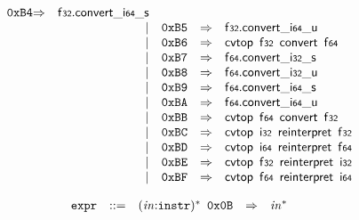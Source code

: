 $$\begin{array}{@{}l@{}rrlll@{}l@{}}
\mathtt{0xB4} &\Rightarrow& \mathsf{f{\scriptstyle32}} . {{{{\mathsf{convert}}{\mathsf{\_}}}{\mathsf{i{\scriptstyle64}}}}{\mathsf{\_}}}{\mathsf{s}} \\ &&|&
\mathtt{0xB5} &\Rightarrow& \mathsf{f{\scriptstyle32}} . {{{{\mathsf{convert}}{\mathsf{\_}}}{\mathsf{i{\scriptstyle64}}}}{\mathsf{\_}}}{\mathsf{u}} \\ &&|&
\mathtt{0xB6} &\Rightarrow& \mathsf{cvtop}~\,\mathsf{f{\scriptstyle32}}~\,\mathsf{convert}~\,\mathsf{f{\scriptstyle64}} \\ &&|&
\mathtt{0xB7} &\Rightarrow& \mathsf{f{\scriptstyle64}} . {{{{\mathsf{convert}}{\mathsf{\_}}}{\mathsf{i{\scriptstyle32}}}}{\mathsf{\_}}}{\mathsf{s}} \\ &&|&
\mathtt{0xB8} &\Rightarrow& \mathsf{f{\scriptstyle64}} . {{{{\mathsf{convert}}{\mathsf{\_}}}{\mathsf{i{\scriptstyle32}}}}{\mathsf{\_}}}{\mathsf{u}} \\ &&|&
\mathtt{0xB9} &\Rightarrow& \mathsf{f{\scriptstyle64}} . {{{{\mathsf{convert}}{\mathsf{\_}}}{\mathsf{i{\scriptstyle64}}}}{\mathsf{\_}}}{\mathsf{s}} \\ &&|&
\mathtt{0xBA} &\Rightarrow& \mathsf{f{\scriptstyle64}} . {{{{\mathsf{convert}}{\mathsf{\_}}}{\mathsf{i{\scriptstyle64}}}}{\mathsf{\_}}}{\mathsf{u}} \\ &&|&
\mathtt{0xBB} &\Rightarrow& \mathsf{cvtop}~\,\mathsf{f{\scriptstyle64}}~\,\mathsf{convert}~\,\mathsf{f{\scriptstyle32}} \\ &&|&
\mathtt{0xBC} &\Rightarrow& \mathsf{cvtop}~\,\mathsf{i{\scriptstyle32}}~\,\mathsf{reinterpret}~\,\mathsf{f{\scriptstyle32}} \\ &&|&
\mathtt{0xBD} &\Rightarrow& \mathsf{cvtop}~\,\mathsf{i{\scriptstyle64}}~\,\mathsf{reinterpret}~\,\mathsf{f{\scriptstyle64}} \\ &&|&
\mathtt{0xBE} &\Rightarrow& \mathsf{cvtop}~\,\mathsf{f{\scriptstyle32}}~\,\mathsf{reinterpret}~\,\mathsf{i{\scriptstyle32}} \\ &&|&
\mathtt{0xBF} &\Rightarrow& \mathsf{cvtop}~\,\mathsf{f{\scriptstyle64}}~\,\mathsf{reinterpret}~\,\mathsf{i{\scriptstyle64}} \\
\end{array}
$$

\vspace{1ex}

$$
\begin{array}{@{}l@{}rrlll@{}l@{}}
& {\mathtt{expr}} &::=& {({\mathit{in}}{:}{\mathtt{instr}})^\ast}~\,\mathtt{0x0B} &\Rightarrow& {{\mathit{in}}^\ast} \\
\end{array}
$$


